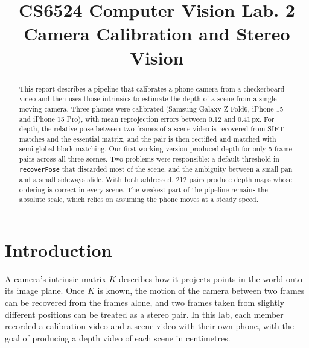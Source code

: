 \documentclass[conference]{assets/latex/IEEEtran}
\begin{document}
\title{CS6524 Computer Vision Lab. 2\\ Camera Calibration and Stereo Vision}

\author{
\and
{}
\and
{}
}

\maketitle

\begin{abstract}
This report describes a pipeline that calibrates a phone camera from a checkerboard video and then uses those intrinsics to estimate the depth of a scene from a single moving camera. Three phones were calibrated (Samsung Galaxy Z Fold6, iPhone 15 and iPhone 15 Pro), with mean reprojection errors between 0.12 and 0.41\,px. For depth, the relative pose between two frames of a scene video is recovered from SIFT matches and the essential matrix, and the pair is then rectified and matched with semi-global block matching. Our first working version produced depth for only 5 frame pairs across all three scenes. Two problems were responsible: a default threshold in \texttt{recoverPose} that discarded most of the scene, and the ambiguity between a small pan and a small sideways slide. With both addressed, 212 pairs produce depth maps whose ordering is correct in every scene. The weakest part of the pipeline remains the absolute scale, which relies on assuming the phone moves at a steady speed.
\end{abstract}

\section{Introduction}
A camera's intrinsic matrix $K$ describes how it projects points in the world onto its image plane. Once $K$ is known, the motion of the camera between two frames can be recovered from the frames alone, and two frames taken from slightly different positions can be treated as a stereo pair. In this lab, each member recorded a calibration video and a scene video with their own phone, with the goal of producing a depth video of each scene in centimetres.
\end{document}
